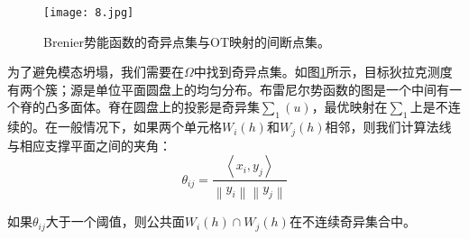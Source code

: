 \begin{figure}[h]
	\centering
	\texttt{[image: 8.jpg]}
	\caption{Brenier势能函数的奇异点集与OT映射的间断点集。}
	\label{fig:8}
\end{figure}

为了避免模态坍塌，我们需要在$\Omega$中找到奇异点集。如图\ref{fig:8}所示，目标狄拉克测度有两个簇；源是单位平面圆盘上的均匀分布。布雷尼尔势函数的图是一个中间有一个脊的凸多面体。脊在圆盘上的投影是奇异集$\sum_1(u)$，最优映射在$\sum_1$上是不连续的。在一般情况下，如果两个单元格$W_i(h)$和$W_j(h)$相邻，则我们计算法线与相应支撑平面之间的夹角：
\begin{equation*}
	\theta _{ij} =\frac{\left \langle x_i,y_j \right \rangle }{\left \| y_i \right \| \left \| y_j \right \| } 
\end{equation*}

如果$\theta _{ij}$大于一个阈值，则公共面$W_i(h) \cap W_j(h)$在不连续奇异集合中。